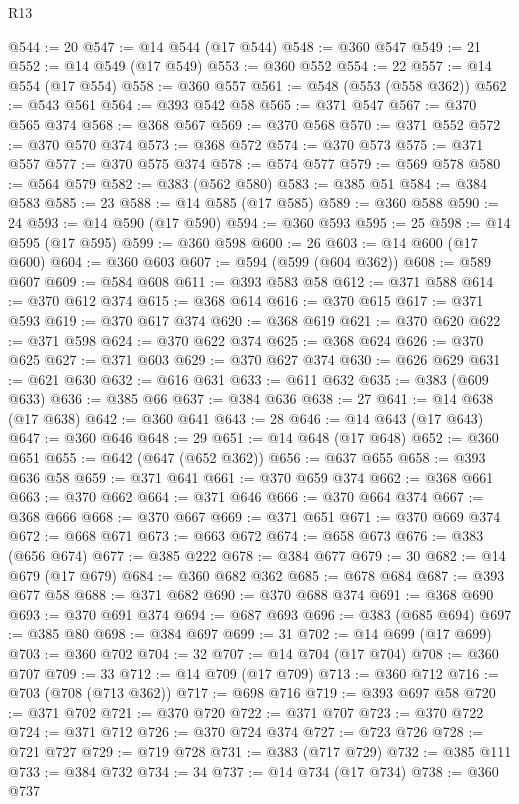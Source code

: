 \begin{lexlean}{R13}
\begin{coremodule}
@544 := 20
@547 := @14 @544 (@17 @544)
@548 := @360 @547
@549 := 21
@552 := @14 @549 (@17 @549)
@553 := @360 @552
@554 := 22
@557 := @14 @554 (@17 @554)
@558 := @360 @557
@561 := @548 (@553 (@558 @362))
@562 := @543 @561
@564 := @393 @542 @58
@565 := @371 @547
@567 := @370 @565 @374
@568 := @368 @567
@569 := @370 @568
@570 := @371 @552
@572 := @370 @570 @374
@573 := @368 @572
@574 := @370 @573
@575 := @371 @557
@577 := @370 @575 @374
@578 := @574 @577
@579 := @569 @578
@580 := @564 @579
@582 := @383 (@562 @580)
@583 := @385 @51
@584 := @384 @583
@585 := 23
@588 := @14 @585 (@17 @585)
@589 := @360 @588
@590 := 24
@593 := @14 @590 (@17 @590)
@594 := @360 @593
@595 := 25
@598 := @14 @595 (@17 @595)
@599 := @360 @598
@600 := 26
@603 := @14 @600 (@17 @600)
@604 := @360 @603
@607 := @594 (@599 (@604 @362))
@608 := @589 @607
@609 := @584 @608
@611 := @393 @583 @58
@612 := @371 @588
@614 := @370 @612 @374
@615 := @368 @614
@616 := @370 @615
@617 := @371 @593
@619 := @370 @617 @374
@620 := @368 @619
@621 := @370 @620
@622 := @371 @598
@624 := @370 @622 @374
@625 := @368 @624
@626 := @370 @625
@627 := @371 @603
@629 := @370 @627 @374
@630 := @626 @629
@631 := @621 @630
@632 := @616 @631
@633 := @611 @632
@635 := @383 (@609 @633)
@636 := @385 @66
@637 := @384 @636
@638 := 27
@641 := @14 @638 (@17 @638)
@642 := @360 @641
@643 := 28
@646 := @14 @643 (@17 @643)
@647 := @360 @646
@648 := 29
@651 := @14 @648 (@17 @648)
@652 := @360 @651
@655 := @642 (@647 (@652 @362))
@656 := @637 @655
@658 := @393 @636 @58
@659 := @371 @641
@661 := @370 @659 @374
@662 := @368 @661
@663 := @370 @662
@664 := @371 @646
@666 := @370 @664 @374
@667 := @368 @666
@668 := @370 @667
@669 := @371 @651
@671 := @370 @669 @374
@672 := @668 @671
@673 := @663 @672
@674 := @658 @673
@676 := @383 (@656 @674)
@677 := @385 @222
@678 := @384 @677
@679 := 30
@682 := @14 @679 (@17 @679)
@684 := @360 @682 @362
@685 := @678 @684
@687 := @393 @677 @58
@688 := @371 @682
@690 := @370 @688 @374
@691 := @368 @690
@693 := @370 @691 @374
@694 := @687 @693
@696 := @383 (@685 @694)
@697 := @385 @80
@698 := @384 @697
@699 := 31
@702 := @14 @699 (@17 @699)
@703 := @360 @702
@704 := 32
@707 := @14 @704 (@17 @704)
@708 := @360 @707
@709 := 33
@712 := @14 @709 (@17 @709)
@713 := @360 @712
@716 := @703 (@708 (@713 @362))
@717 := @698 @716
@719 := @393 @697 @58
@720 := @371 @702
@721 := @370 @720
@722 := @371 @707
@723 := @370 @722
@724 := @371 @712
@726 := @370 @724 @374
@727 := @723 @726
@728 := @721 @727
@729 := @719 @728
@731 := @383 (@717 @729)
@732 := @385 @111
@733 := @384 @732
@734 := 34
@737 := @14 @734 (@17 @734)
@738 := @360 @737

\end{coremodule}
\end{lexlean}
